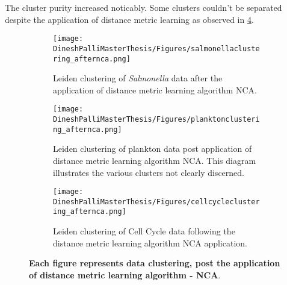 \documentclass[12pt,a4paper]{article}
\begin{document}


The cluster purity increased noticably. Some clusters couldn't be separated despite the application of distance metric learning as observed in \ref{multifig4:DML_Clusters}.

\begin{figure}
  \centering
  \begin{subfigure}{\linewidth}
    \texttt{[image: DineshPalliMasterThesis/Figures/salmonellaclustering\_afternca.png]}
    \caption{Leiden clustering of \textit{Salmonella} data after the application of distance metric learning algorithm NCA.}
    \label{multifig4:image_a}
  \end{subfigure}
  \hfill
  \begin{subfigure}{\linewidth}
    \texttt{[image: DineshPalliMasterThesis/Figures/planktonclustering\_afternca.png]}
    \caption{Leiden clustering of plankton data post application of distance metric learning algorithm NCA. This diagram illustrates the various clusters not clearly discerned.}
    \label{multifig4:image_b}
  \end{subfigure}
  \hfill
  \begin{subfigure}{\linewidth}
    \texttt{[image: DineshPalliMasterThesis/Figures/cellcycleclustering\_afternca.png]}
    \caption{Leiden clustering of Cell Cycle data following the distance metric learning algorithm NCA application.}
    \label{multifig4:image_c}
  \end{subfigure}
  \caption[Clustering after the application of distance metric learning]{\textbf{Each figure represents data clustering, post the application of distance metric learning algorithm - NCA}.}
  \label{multifig4:DML_Clusters}
\end{figure}
\end{document}
